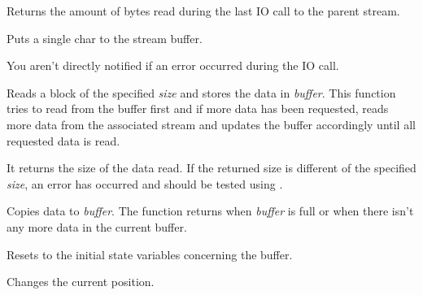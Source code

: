 
Returns the amount of bytes read during the last IO call to the parent stream.


\label{wxstreambufferputchar}


Puts a single char to the stream buffer.


You aren't directly notified if an error occurred during the IO call.




\label{wxstreambufferread}


Reads a block of the specified {\it size} and stores the data in {\it buffer}.
This function tries to read from the buffer first and if more data has been
requested, reads more data from the associated stream and updates the buffer
accordingly until all requested data is read.


It returns the size of the data read. If the returned size is different of the specified 
{\it size}, an error has occurred and should be tested using 
.


Copies data to {\it buffer}. The function returns when {\it buffer} is full or when there isn't
any more data in the current buffer.




\label{wxstreambufferresetbuffer}


Resets to the initial state variables concerning the buffer.


\label{wxstreambufferseek}


Changes the current position.

